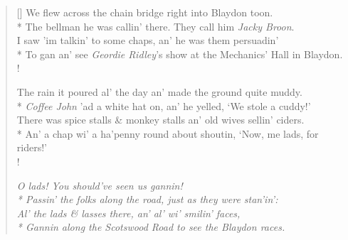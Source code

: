 \documentclass[MAIN]{subfiles}
\begin{document}
\begin{verse}[\versewidth]
We flew across the chain bridge right into {\sc Blaydon} toon.\\*
The bellman he was callin' there. They call him \emph{Jacky Broon}.\\
I saw 'im talkin' to some chaps, an' he was them persuadin'\\*
To gan an' see \emph{Geordie Ridley}'s show at the {\sc Mechanics' Hall} in {\sc Blaydon}.\\!

The rain it poured al' the day an' made the ground quite muddy.\\*
\emph{Coffee John} 'ad a white hat on, an' he yelled, `We stole a cuddy!'\\
There was spice stalls \& monkey stalls an' old wives sellin' ciders.\\*
An' a chap wi' a ha'penny round about shoutin, `Now, me lads, for riders!'\\!

{\it O lads! You should've seen us gannin!\\*
Passin' the folks along the road, just as they were stan'in':\\
Al' the lads \& lasses there, an' al' wi' smilin' faces,\\*
Gannin along the {\sc Scotswood Road} to see the {\sc Blaydon} races.}
\end{verse}
\end{document}
